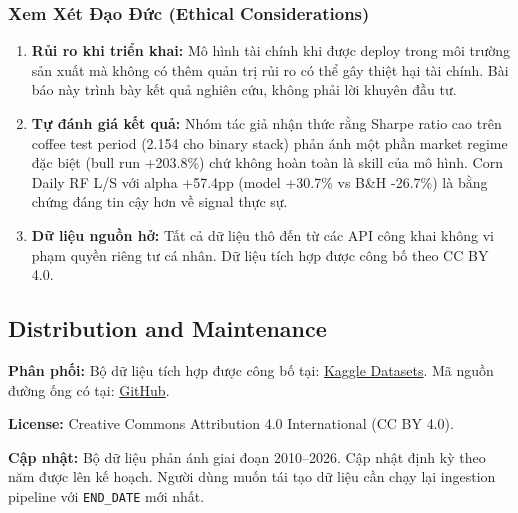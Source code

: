 \subsubsection{Xem Xét Đạo Đức (Ethical Considerations)}

\begin{enumerate}
\item \textbf{Rủi ro khi triển khai:} Mô hình tài chính khi được deploy trong môi
      trường sản xuất mà không có thêm quản trị rủi ro có thể gây thiệt hại tài chính.
      Bài báo này trình bày kết quả nghiên cứu, không phải lời khuyên đầu tư.

\item \textbf{Tự đánh giá kết quả:} Nhóm tác giả nhận thức rằng Sharpe ratio cao
      trên coffee test period (2.154 cho binary stack) phản ánh một phần market regime
      đặc biệt (bull run +203.8\%) chứ không hoàn toàn là skill của mô hình.
      Corn Daily RF L/S với alpha +57.4pp (model +30.7\% vs B\&H -26.7\%) là bằng
      chứng đáng tin cậy hơn về signal thực sự.

\item \textbf{Dữ liệu nguồn hở:} Tất cả dữ liệu thô đến từ các API công khai không
      vi phạm quyền riêng tư cá nhân. Dữ liệu tích hợp được công bố theo CC BY 4.0.
\end{enumerate}

\subsection{Distribution and Maintenance}

\textbf{Phân phối:}
Bộ dữ liệu tích hợp được công bố tại: \href{https://www.kaggle.com/datasets/khimtagia/agricommodity-futures-multi-source-ml-dataset}{Kaggle Datasets}. Mã nguồn đường ống có tại: \href{https://github.com/ZaKhimNe/DS108_Commodity-price-forecasting}{GitHub}.

\textbf{License:} Creative Commons Attribution 4.0 International (CC BY 4.0).

\textbf{Cập nhật:}
Bộ dữ liệu phản ánh giai đoạn 2010--2026. Cập nhật định kỳ theo năm được lên kế hoạch.
Người dùng muốn tái tạo dữ liệu cần chạy lại ingestion pipeline với \texttt{END\_DATE}
mới nhất.



